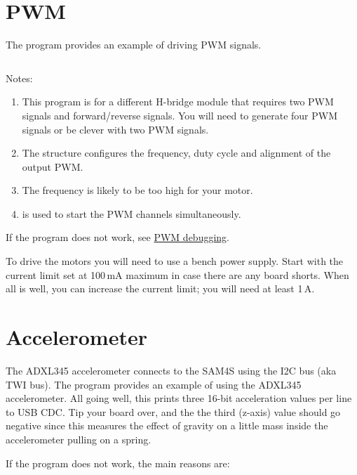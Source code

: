 \section{PWM}
\label{pwm-test}

The program  provides an
example of driving PWM signals.

\inputminted{C}{../../src/test-apps/pwm_test2/pwm_test2.c}

Notes:
%
\begin{enumerate}
\item
  This program is for a different H-bridge module that requires two
  PWM signals and forward/reverse signals. You will need to generate
  four PWM signals or be clever with two PWM signals.

\item
  The  structure configures the frequency, duty cycle
  and alignment of the output PWM.

\item The frequency is likely to be too high for your motor.

\item {} is used to start the PWM channels
  simultaneously.
\end{enumerate}

If the program does not work, see  \hyperref[debugging-pwm]{PWM debugging}.

To drive the motors you will need to use a bench power supply. Start
with the current limit set at 100\,mA maximum in case there are any
board shorts.  When all is well, you can increase the current limit;
you will need at least 1\,A.

\section{Accelerometer}
\label{accelerometer-test}

The ADXL345 accelerometer connects to the SAM4S using the I2C bus (aka
TWI bus).  The program
 provides
an example of using the ADXL345 accelerometer.  All going well, this
prints three 16-bit acceleration values per line to USB CDC. Tip your
board over, and the the third (z-axis) value should go negative since
this measures the effect of gravity on a little mass inside the
accelerometer pulling on a spring.

If the program does not work, the main reasons are:

